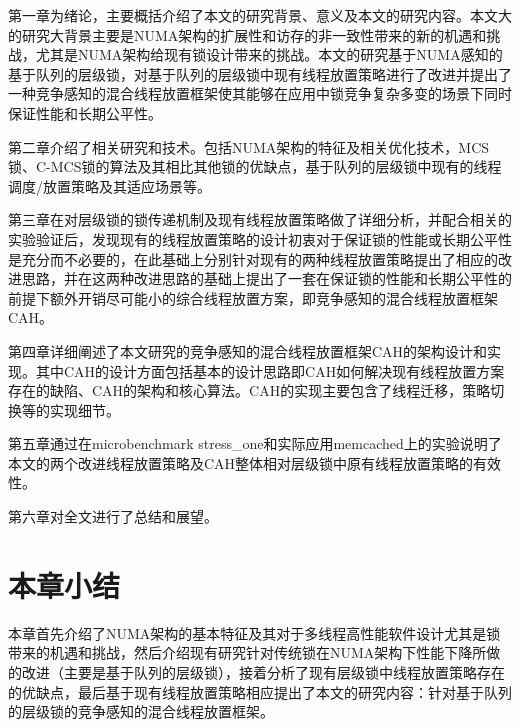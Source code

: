 第一章为绪论，主要概括介绍了本文的研究背景、意义及本文的研究内容。本文大的研究大背景主要是NUMA架构的扩展性和访存的非一致性带来的新的机遇和挑战，尤其是NUMA架构给现有锁设计带来的挑战。本文的研究基于NUMA感知的基于队列的层级锁，对基于队列的层级锁中现有线程放置策略进行了改进并提出了一种竞争感知的混合线程放置框架使其能够在应用中锁竞争复杂多变的场景下同时保证性能和长期公平性。

第二章介绍了相关研究和技术。包括NUMA架构的特征及相关优化技术，MCS锁、C-MCS锁的算法及其相比其他锁的优缺点，基于队列的层级锁中现有的线程调度/放置策略及其适应场景等。

第三章在对层级锁的锁传递机制及现有线程放置策略做了详细分析，并配合相关的实验验证后，发现现有的线程放置策略的设计初衷对于保证锁的性能或长期公平性是充分而不必要的，在此基础上分别针对现有的两种线程放置策略提出了相应的改进思路，并在这两种改进思路的基础上提出了一套在保证锁的性能和长期公平性的前提下额外开销尽可能小的综合线程放置方案，即竞争感知的混合线程放置框架CAH。

第四章详细阐述了本文研究的竞争感知的混合线程放置框架CAH的架构设计和实现。其中CAH的设计方面包括基本的设计思路即CAH如何解决现有线程放置方案存在的缺陷、CAH的架构和核心算法。CAH的实现主要包含了线程迁移，策略切换等的实现细节。

第五章通过在microbenchmark stress\_one和实际应用memcached上的实验说明了本文的两个改进线程放置策略及CAH整体相对层级锁中原有线程放置策略的有效性。

第六章对全文进行了总结和展望。
\section{本章小结}
本章首先介绍了NUMA架构的基本特征及其对于多线程高性能软件设计尤其是锁带来的机遇和挑战，然后介绍现有研究针对传统锁在NUMA架构下性能下降所做的改进（主要是基于队列的层级锁），接着分析了现有层级锁中线程放置策略存在的优缺点，最后基于现有线程放置策略相应提出了本文的研究内容：针对基于队列的层级锁的竞争感知的混合线程放置框架。